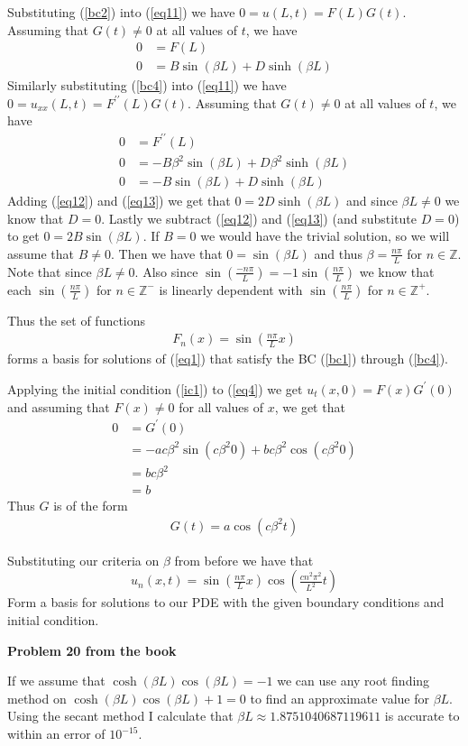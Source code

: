 \documentclass[12pt]{article}
\newcommand{\problem}[1]{\hspace{-4 ex} \large \textbf{Problem #1} }
\newcommand{\ZZ}{\mathbb{Z}}
\begin{document}
	Substituting (\ref{bc2}) into (\ref{eq11}) we have $0 = u(L,t) = F(L)G(t)$. Assuming that $G(t) \neq 0$ at all values of $t$, we have
	\begin{align}
		0 & = F(L) \nonumber \\
		0 & = B \sin(\beta L) + D \sinh(\beta L) \label{eq12}
	\end{align}
	Similarly substituting (\ref{bc4}) into (\ref{eq11}) we have $0 = u_{xx}(L,t) = F^{\prime\prime}(L)G(t)$. Assuming that $G(t) \neq 0$ at all values of $t$, we have
	\begin{align}
	0 & = F^{\prime\prime}(L) \nonumber \\
	0 & = -B \beta^2\sin(\beta L) + D \beta^2\sinh(\beta L) \nonumber \\
	0 & = -B \sin(\beta L) + D \sinh(\beta L) \label{eq13}
	\end{align}
	Adding (\ref{eq12}) and (\ref{eq13}) we get that $0=2D \sinh (\beta L)$ and since $\beta L \neq 0$ we know that $D=0$. Lastly we subtract (\ref{eq12}) and (\ref{eq13}) (and substitute $D=0$) to get $ 0 = 2B \sin(\beta L)$. If $B=0$ we would have the trivial solution, so we will assume that $B \neq 0$. Then we have that $0 = \sin(\beta L)$ and thus $\beta = \tfrac{n\pi}{L}$ for $n \in \ZZ$. Note that since $\beta L \neq 0$. Also since $\sin(\tfrac{-n\pi}{L}) = -1\sin(\tfrac{n\pi}{L})$ we know that each $\sin(\tfrac{n\pi}{L})$ for $n \in \ZZ^-$ is linearly dependent with $\sin(\tfrac{n\pi}{L})$ for $n \in \ZZ^+$. \bigbreak
	
	Thus the set of functions
	\begin{align}
		F_n(x) = \sin(\tfrac{n\pi}{L}x) \label{eq14}
	\end{align}
	forms a basis for solutions of (\ref{eq1}) that satisfy the BC (\ref{bc1}) through (\ref{bc4}). \bigbreak
	
	Applying the initial condition (\ref{ic1}) to (\ref{eq4}) we get $u_t(x,0) = F(x)G^\prime(0)$ and assuming that $F(x) \neq 0$ for all values of $x$, we get that 
	\begin{align*}
		0 & = G^\prime(0) \\
		& = -a c \beta^2 \sin(c \beta^2 0) + b c \beta^2 \cos(c \beta^2 0) \\
		& = b c \beta^2 \\
		& = b
	\end{align*}
	Thus $G$ is of the form
	\begin{align}
		G(t) = a \cos(c \beta^2 t)
	\end{align}
	
	Substituting our criteria on $\beta$ from before we have that
	$$
		u_n(x,t) = \sin(\tfrac{n\pi}{L}x) \cos(\tfrac{cn^2 \pi^2}{L^2}t)
	$$
	Form a basis for solutions to our PDE with the given boundary conditions and initial condition.
	
\problem{20 from the book}
	
	If we assume that $\cosh(\beta L) \cos(\beta L) = -1$ we can use any root finding method on $\cosh(\beta L) \cos(\beta L) +1 = 0$ to find an approximate value for $\beta L$. Using the secant method I calculate that $\beta L \approx 1.8751040687119611$ is accurate to within an error of $10^{-15}$. 
	
\end{document}
